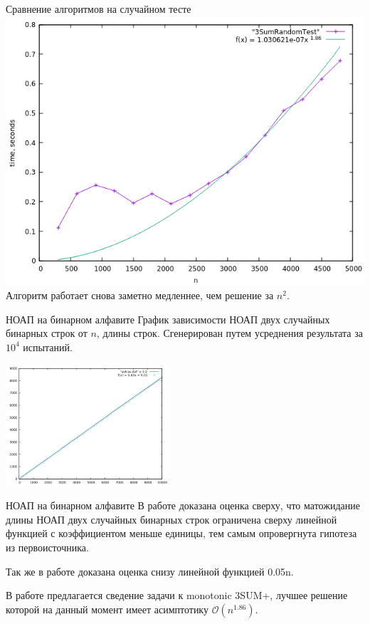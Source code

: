 \documentclass[hyperref=unicode,graphics=pdflatex,12pt]{beamer}
\begin{document}
\begin{frame}{Сравнение алгоритмов на случайном тесте}
\includegraphics[scale=0.5]{pics/5.png}
Алгоритм работает снова заметно медленнее, чем решение за $n^2$.
\end{frame}

\begin{frame}{НОАП на бинарном алфавите}
График зависимости НОАП двух случайных бинарных строк от $n$, длины строк. Сгенерирован путем усреднения результата за $10^4$ испытаний.
\begin{center}
\includegraphics[width=6cm]{pics/avlcas.png}
\end{center}
\end{frame}

\begin{frame}{НОАП на бинарном алфавите}
В работе доказана оценка сверху, что матожидание длины НОАП двух случайных бинарных строк
ограничена сверху линейной функцией с коэффициентом меньше единицы, тем самым опровергнута гипотеза из первоисточника.

\vspace{0.5cm}
Так же в работе доказана оценка снизу линейной функцией 0.05n.

\vspace{0.5cm}
В работе предлагается сведение задачи к monotonic 3SUM+, лучшее решение которой на данный момент имеет
асимптотику $\mathcal{O}(n^{1.86})$.
\end{frame}
\end{document}
